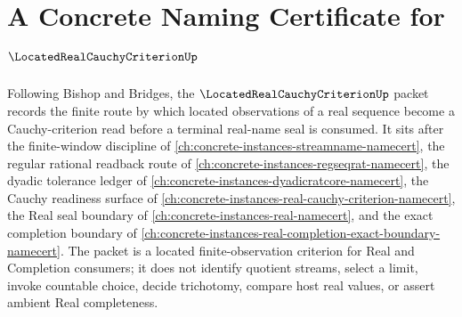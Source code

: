 \chapter{A Concrete Naming Certificate for $\LocatedRealCauchyCriterionUp$}
\label{ch:concrete-instances-located-real-cauchy-criterion-namecert}

Following Bishop and Bridges, the $\LocatedRealCauchyCriterionUp$ packet records the finite route by which located observations of a real sequence become a Cauchy-criterion read before a terminal real-name seal is consumed. It sits after the finite-window discipline of \autoref{ch:concrete-instances-streamname-namecert}, the regular rational readback route of \autoref{ch:concrete-instances-regseqrat-namecert}, the dyadic tolerance ledger of \autoref{ch:concrete-instances-dyadicratcore-namecert}, the Cauchy readiness surface of \autoref{ch:concrete-instances-real-cauchy-criterion-namecert}, the Real seal boundary of \autoref{ch:concrete-instances-real-namecert}, and the exact completion boundary of \autoref{ch:concrete-instances-real-completion-exact-boundary-namecert}. The packet is a located finite-observation criterion for Real and Completion consumers; it does not identify quotient streams, select a limit, invoke countable choice, decide trichotomy, compare host real values, or assert ambient Real completeness.

